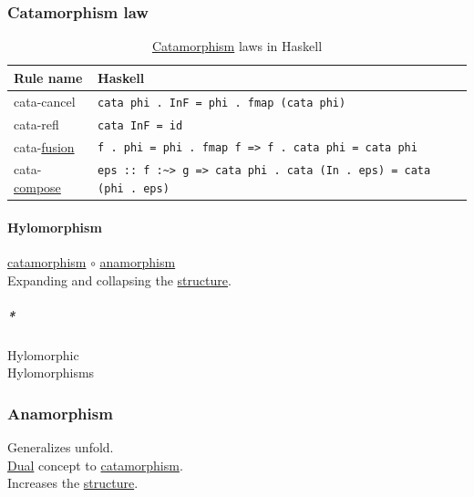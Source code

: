 \documentclass[a4paper,14pt,oneside]{book}
\begin{document}
{\subsubsection{\label{orgd271d7f}Catamorphism law}
\label{sec:org844681e}
\begin{table}[htbp]
\caption{\label{tab--catamorphism-law-in-haskell}\hyperref[org524224c]{Catamorphism} laws in Haskell}
\centering
\begin{tabu} spread \linewidth {ll}
\toprule
Rule name & Haskell\\
\midrule
cata-cancel & \texttt{cata phi . InF = phi . fmap (cata phi)}\\
cata-refl & \texttt{cata InF = id}\\
cata-\hyperref[org822c67f]{fusion} & \texttt{f . phi = phi . fmap f => f . cata phi = cata phi}\\
cata-\hyperref[org22ff753]{compose} & \texttt{eps :: f :\textasciitilde{}> g => cata phi . cata (In . eps) = cata (phi . eps)}\\
\bottomrule
\end{tabu}
\end{table}

\paragraph{\label{org955e7b5}Hylomorphism}
\label{sec:org6859e39}
\hyperref[org524224c]{catamorphism} \(\circ\) \hyperref[org13c3c8d]{anamorphism}\\

Expanding and collapsing the \hyperref[org080800e]{structure}.\\

\subparagraph{\emph{*}}
\label{sec:org6945bb0}

\label{org71e5be0}Hylomorphic\\
\label{org1e2aeea}Hylomorphisms\\

\subsubsection{\label{org13c3c8d}Anamorphism}
\label{sec:orgbc4f68c}
Generalizes unfold.\\

\hyperref[orgdbf0070]{Dual} concept to \hyperref[org524224c]{catamorphism}.\\

Increases the \hyperref[org080800e]{structure}.\\

}
\end{document}
